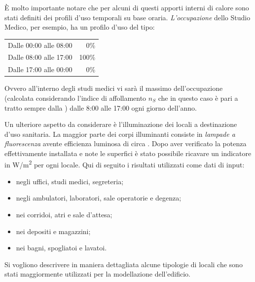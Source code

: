 È molto importante notare che per alcuni di questi apporti interni di calore sono stati definiti dei profili d'uso temporali su base oraria. \emph{L'occupazione} dello Studio Medico, per esempio, ha un profilo d'uso del tipo:
\begin{center}
	\begin{tabular}{lr}
		\toprule
		Dalle 00:00 alle 08:00 & 0\% \\
		Dalle 08:00 alle 17:00 & 100\% \\
		Dalle 17:00 alle 00:00 & 0\% \\
		\bottomrule
	\end{tabular}
\end{center}
Ovvero all'interno degli studi medici vi sarà il massimo dell'occupazione (calcolata considerando l'indice di affollamento $n_S$ che in questo caso è pari a  tratto sempre dalla \norvent) dalle 8:00 alle 17:00 ogni giorno dell'anno.

Un ulteriore aspetto da considerare è l'illuminazione dei locali a destinazione d'uso sanitaria. La maggior parte dei corpi illuminanti consiste in \emph{lampade a fluorescenza} avente efficienza luminosa di circa . Dopo aver verificato la potenza effettivamente installata e note le superfici è stato possibile ricavare un indicatore in \si{W/m^2} per ogni locale. Qui di seguito i risultati utilizzati come dati di input:
\begin{itemize}
	\item {} negli uffici, studi medici, segreteria;
	\item {} negli ambulatori, laboratori, sale operatorie e degenza;
	\item {} nei corridoi, atri e sale d'attesa;
	\item {} nei depositi e magazzini;
	\item {} nei bagni, spogliatoi e lavatoi.
\end{itemize}

Si vogliono descrivere in maniera dettagliata alcune tipologie di locali che sono stati maggiormente utilizzati per la modellazione dell'edificio.

\newpage
